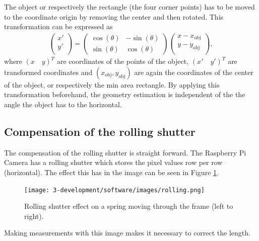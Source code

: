 The object or respectively the rectangle (the four corner points) has to be moved to the coordinate origin by removing the center and then rotated.
This transformation can be expressed as
\begin{align*}
	\begin{pmatrix}
	x'\\
	y'\\
	\end{pmatrix}=
	\begin{pmatrix}
	\cos(\theta)&-\sin(\theta)\\
	\sin(\theta)&\cos(\theta)
	\end{pmatrix}
	\begin{pmatrix}
	x-x_{\text{obj}}\\
	y-y_{\text{obj}}\\
	\end{pmatrix},	
\end{align*}
where $(x\quad y)^T$ are coordinates of the points of the object, $(x'\quad y')^T$ are transformed coordinates and $(x_{\text{obj}}, y_{\text{obj}})$ are again the coordinates of the center of the object, or respectively the min area rectangle.
By applying this transformation beforehand, the geometry estimation is independent of the the angle the object has to the horizontal. 

\subsection{Compensation of the rolling shutter}
The compensation of the rolling shutter is straight forward.
The Raspberry Pi Camera has a rolling shutter which stores the pixel values row per row (horizontal).
The effect this has in the image can be seen in Figure \ref{development:rolling}.
\begin{figure}[ht]
	\centering
	\texttt{[image: 3-development/software/images/rolling.png]}
	\caption{Rolling shutter effect on a spring moving through the frame (left to right).\label{development:rolling}}
\end{figure}
Making measurements with this image makes it necessary to correct the length.
 

